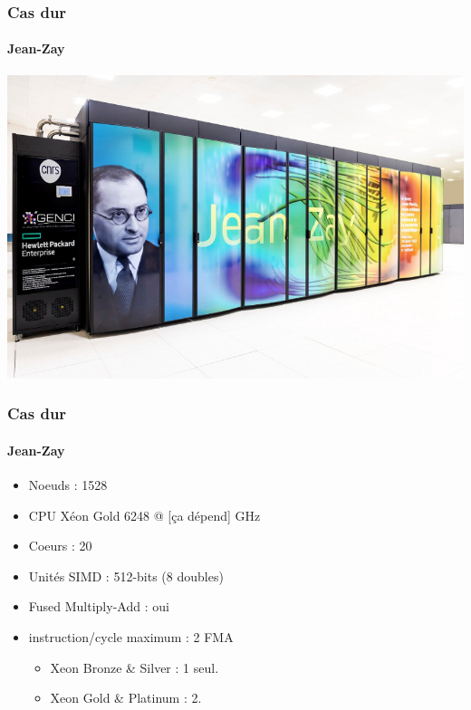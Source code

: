 \documentclass[xcolor={x11names,svgnames}, 14pt]{beamer}
\begin{document}

\begin{frame}
  \frametitle{Cas dur}
  \framesubtitle{Jean-Zay}

  \includegraphics[width=\textwidth]{jean-zay-bis}
\end{frame}

\begin{frame}
  \frametitle{Cas dur}
  \framesubtitle{Jean-Zay}

  \begin{itemize}
  \item Noeuds : 1528
  \item CPU Xéon Gold 6248 @ \alert{[ça dépend]} GHz
  \item Coeurs : 20
  \item Unités SIMD : 512-bits (8 doubles)
  \item Fused Multiply-Add : oui
  \item instruction/cycle maximum : \alert{2 FMA}
    \begin{itemize}
    \item Xeon Bronze \& Silver : 1 seul.
    \item Xeon Gold \& Platinum : 2.
    \end{itemize}
  \end{itemize}
\end{frame}

\end{document}
